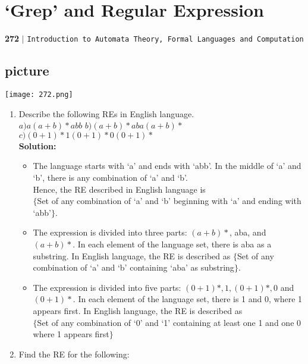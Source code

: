 \documentclass[8pt]{beamer}
\begin{document}
\begin{frame}
\section*{‘Grep’ and Regular Expression}
\begin{flushleft}
    \textbf{272}\hspace*{0.1cm} \textbf{$|$} \hspace*{0.1cm} \texttt{Introduction to Automata Theory, Formal Languages and Computation}
  \end{flushleft}


\begin{center}
\section{picture}
\texttt{[image: 272.png]}
\end{center}

\small{
\begin{enumerate}
  \item Describe the following REs in English language.\\
  $a) a(a+b)*abb$   \hspace*{0.4cm}  $b) (a+b)*aba(a+b)*$  \hspace*{0.4cm}  $c) (0+1)*1(0+1)*0(0+1)*$ \\
  \textbf{Solution:}\\
  \begin{itemize}
    \item The language starts with ‘a’ and ends with ‘abb’. In the middle of ‘a’ and ‘b’, there is any
combination of ‘a’ and ‘b’.\\
Hence, the RE described in English language is\\
$\{$Set of any combination of ‘a’ and ‘b’ beginning with ‘a’ and ending with ‘abb’$\}$.\\
    \item The expression is divided into three parts: $(a+b)*$, aba, and $(a+b)*$. In each element of the
language set, there is aba as a substring. In English language, the RE is described as
$\{$Set of any combination of ‘a’ and ‘b’ containing ‘aba’ as substring$\}$.\\
    \item The expression is divided into five parts: $(0+1)*, 1, (0+1)*, 0$ and $(0+1)*$. In each element
of the language set, there is 1 and 0, where 1 appears first. In English language, the RE is
described as\\
$\{$Set of any combination of ‘0’ and ‘1’ containing at least one 1 and one 0 where 1 appears
first$\}$ \\
  \end{itemize}
  \item Find the RE for the following:\\
\end{enumerate}
}
\end{frame}
\end{document}

